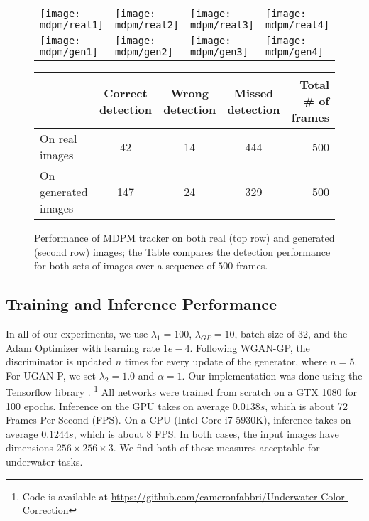 \begin{figure*}
\centering
\begin{tabular}{p{4.0cm} p{4.0cm} p{4.0cm} p{4.0cm}}
   \texttt{[image: mdpm/real1]} &
   \texttt{[image: mdpm/real2]} &
   \texttt{[image: mdpm/real3]} &
   \texttt{[image: mdpm/real4]} \\
   \texttt{[image: mdpm/gen1]} &
   \texttt{[image: mdpm/gen2]} &
   \texttt{[image: mdpm/gen3]} &
   \texttt{[image: mdpm/gen4]} \\
\end{tabular}
\label{fig:mdpm}
\vspace{4mm}

\begin{tabular}{l|c|c|c|r|}
 \cline{2-5}
 &  Correct detection & Wrong detection & Missed detection & Total \# of frames\\ \hline  \cline{2-4}
On real images  &  42 & 14 & 444 & 500  \\ \hline
On generated images  &  147 & 24 & 329 & 500  \\ \hline
\end{tabular}

\caption{Performance of MDPM tracker \cite{islam2017mixed} on both real (top row) and generated (second row) images; the Table 
compares the detection performance for both sets of images over a sequence of $500$ frames.   }
\label{mdpmStuff}
\end{figure*}

\subsection{Training and Inference Performance}
In all of our experiments, we use $\lambda_{1} = 100$, $\lambda_{GP} = 10$, batch size of 32, and the Adam Optimizer 
\cite{kingma2014adam} with learning rate $1e-4$. Following WGAN-GP, the discriminator is updated $n$ times for every update of the 
generator, where $n = 5$. For UGAN-P, we set $\lambda_{2} = 1.0$ and $\alpha = 1$. Our implementation was done using the 
Tensorflow library \cite{abadi2016tensorflow}. \footnote{Code is available at 
\url{https://github.com/cameronfabbri/Underwater-Color-Correction}} All networks were trained from scratch on a GTX 1080 for 100 
epochs. Inference on the GPU takes on average $ 0.0138s$, which is about 72 Frames Per Second (FPS). On a CPU (Intel Core 
i7-5930K), inference takes on average $ 0.1244s$, which is about 8 FPS. In both cases, the input images have dimensions 
$256\times 256\times 3$. We find both of these measures acceptable for underwater tasks.

